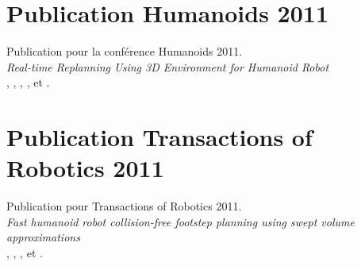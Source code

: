 \appendix

\section{Publication Humanoids 2011}

Publication pour la conférence Humanoids 2011.\\
\emph{Real-time Replanning Using 3D Environment for Humanoid Robot}\\
\leo, \nicolas, \olivier, \thomas, \eiichi et \florent.




 
 
 
 
 
 


\section{Publication Transactions of Robotics 2011}

Publication pour Transactions of Robotics 2011.\\
\emph{Fast humanoid robot collision-free footstep planning
using swept volume approximations}\\
\nicolas, \olivier, \leo, \florent et \eiichi.














